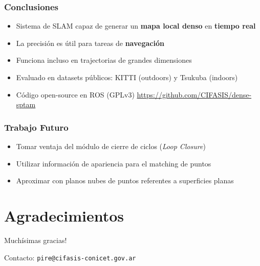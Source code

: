 \documentclass[compress]{beamer}
\begin{document}
\begin{frame}
	\frametitle{Conclusiones}
	\begin{itemize}
		\item Sistema de SLAM capaz de generar un \textbf{mapa local denso} en \textbf{tiempo real}
        \item La precisión es útil para tareas de \textbf{navegación}
        \item Funciona incluso en trajectorias de grandes dimensiones
        \item Evaluado en datasets públicos: KITTI (outdoors) y Tsukuba (indoors)
	    \item Código open-source en ROS (GPLv3)
	    \url{https://github.com/CIFASIS/dense-sptam}
	\end{itemize}
\end{frame}

\begin{frame}
	\frametitle{Trabajo Futuro}
	\begin{itemize}
		\item Tomar ventaja del módulo de cierre de ciclos (\emph{Loop Closure})
		\item Utilizar información de apariencia para el matching de puntos
		\item Aproximar con planos nubes de puntos referentes a superficies planas
	\end{itemize}
\end{frame}


\section*{Agradecimientos}

\begin{frame}
	\centering
	\Large{Muchísimas gracias!}
	
	
	\vspace{2cm}
	Contacto: {\tt pire@cifasis-conicet.gov.ar}
\end{frame}
\end{document}
